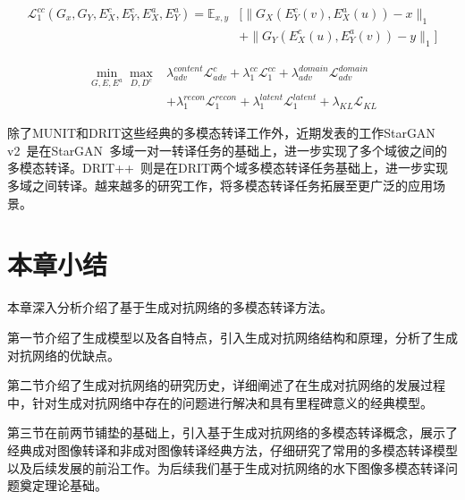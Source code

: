 \begin{equation}
\label{equ:drit_cc}
\begin{aligned}
\mathcal{L}_1^{cc}(G_x,G_Y,E_X^c,E_Y^c,E_X^a,E_Y^a) = \mathbb{E}_{x,y}&[\parallel G_X(E_Y^c(v),E_X^a(u))-x \parallel_1 \\
& + \parallel G_Y(E_X^c(u),E_Y^a(v))-y \parallel_1]
\end{aligned}
\end{equation}

\begin{equation}
\label{equ:drit}
\begin{aligned}
\min \limits_{G,E,E^a} \max \limits_{D,D^c} & \lambda_{adv}^{content}\mathcal{L}_{adv}^c + \lambda_1^{cc}\mathcal{L}_1^{cc} + \lambda_{adv}^{domain}\mathcal{L}_{adv}^{domain} \\
& + \lambda_1^{recon}\mathcal{L}_1^{recon} + \lambda_1^{latent}\mathcal{L}_1^{latent} + \lambda_{KL}\mathcal{L}_{KL}
\end{aligned}
\end{equation}

除了MUNIT和DRIT这些经典的多模态转译工作外，近期发表的工作StarGAN v2~\cite{choi2020stargan}是在StarGAN~\cite{choi2018stargan}多域一对一转译任务的基础上，进一步实现了多个域彼之间的多模态转译。DRIT++~\cite{lee2020drit++}则是在DRIT两个域多模态转译任务基础上，进一步实现多域之间转译。越来越多的研究工作，将多模态转译任务拓展至更广泛的应用场景。


\section{本章小结}
本章深入分析介绍了基于生成对抗网络的多模态转译方法。

第一节介绍了生成模型以及各自特点，引入生成对抗网络结构和原理，分析了生成对抗网络的优缺点。

第二节介绍了生成对抗网络的研究历史，详细阐述了在生成对抗网络的发展过程中，针对生成对抗网络中存在的问题进行解决和具有里程碑意义的经典模型。

第三节在前两节铺垫的基础上，引入基于生成对抗网络的多模态转译概念，展示了经典成对图像转译和非成对图像转译经典方法，仔细研究了常用的多模态转译模型以及后续发展的前沿工作。为后续我们基于生成对抗网络的水下图像多模态转译问题奠定理论基础。